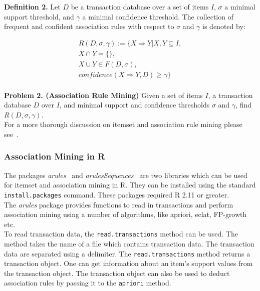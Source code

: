 \documentclass{article}
\begin{document}
{\bf Definition 2.} Let $D$ be a transaction database over a set of items $I$, $\sigma$ a minimal support threshold, and $\gamma$ a minimal confidence threshold. The collection of frequent and confident association rules with respect to $\sigma$ and $\gamma$ is denoted by:

\begin{align*}
R(D, \sigma, \gamma) := \{X \Rightarrow Y | X, Y \subseteq I, \\
X \cap Y = \{\}, \\X \cup Y \in F(D, \sigma),\\ confidence(X \Rightarrow Y, D) \ge \gamma\}
\end{align*}\\


{\bf Problem 2. (Association Rule Mining)} Given a set of items $I$, a transaction database $D$ over $I$, and minimal support and confidence thresholds $\sigma$ and $\gamma$, find $R(D, \sigma, \gamma)$. \\

For a more thorough discussion on itemset and association rule mining please see~\cite{report:patternmining}.\\

\subsubsection{Association Mining in R}

The packages {\sl arules}~\cite{r:arules} and {\sl arulesSequences}~\cite{r:arulesseq} are two libraries which can be used for itemset and association mining in R. They can be installed using the standard \verb=install.packages= command. These packages required R 2.11 or greater.\\

The {\sl arules} package provides functions to read in transactions
and perform association mining using a number of algorithms, like
apriori, eclat, FP-growth etc.\\

To read transaction data, the \verb=read.transactions= method can be
used. The method takes the name of a file which contains transaction
data. The transaction data are separated using a delimiter. The
\verb=read.transactions= method returns a transaction object. One can
get information about an item's support values from the transaction
object. The transaction object can also be used to deduct association
rules by passing it to the \verb=apriori= method.
\end{document}
